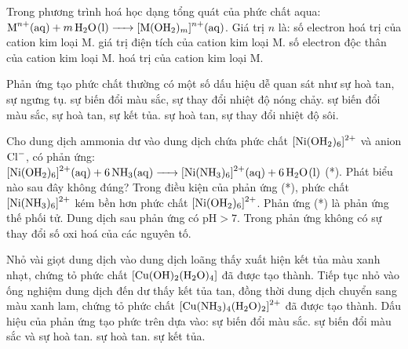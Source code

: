 \documentclass[11pt,a4paper]{article}
\begin{document}
\begin{ex}
Trong phương trình hoá học dạng tổng quát của phức chất aqua: $\ce{M^{n+}(aq) + m H2O(l) -> [M(OH2)_m]^{n+}(aq)}$. Giá trị $n$ là:
\choice
{số electron hoá trị của cation kim loại M.}
{\True giá trị điện tích của cation kim loại M.}
{số electron độc thân của cation kim loại M.}
{hoá trị của cation kim loại M.}
\end{ex}

\begin{ex}
Phản ứng tạo phức chất thường có một số dấu hiệu dễ quan sát như
\choice
{sự hoà tan, sự ngưng tụ.}
{sự biến đổi màu sắc, sự thay đổi nhiệt độ nóng chảy.}
{\True sự biến đổi màu sắc, sự hoà tan, sự kết tủa.}
{sự hoà tan, sự thay đổi nhiệt độ sôi.}
\end{ex}

\begin{ex}
Cho dung dịch ammonia dư vào dung dịch chứa phức chất $\ce{[Ni(OH2)6]^2+}$ và anion $\ce{Cl-}$, có phản ứng: $\ce{[Ni(OH2)6]^2+(aq) + 6NH3(aq) -> [Ni(NH3)6]^2+(aq) + 6H2O(l)}$ (*). Phát biểu nào sau đây không đúng?
\choice
{\True Trong điều kiện của phản ứng (*), phức chất $\ce{[Ni(NH3)6]^2+}$ kém bền hơn phức chất $\ce{[Ni(OH2)6]^2+}$.}
{Phản ứng (*) là phản ứng thế phối tử.}
{Dung dịch sau phản ứng có $\text{pH} > 7$.}
{Trong phản ứng không có sự thay đổi số oxi hoá của các nguyên tố.}
\end{ex}

\begin{ex}
Nhỏ vài giọt dung dịch  vào dung dịch  loãng thấy xuất hiện kết tủa màu xanh nhạt, chứng tỏ phức chất $\ce{[Cu(OH)2(H2O)4]}$ đã được tạo thành. Tiếp tục nhỏ vào ống nghiệm dung dịch  đến dư thấy kết tủa tan, đồng thời dung dịch chuyển sang màu xanh lam, chứng tỏ phức chất $\ce{[Cu(NH3)4(H2O)2]^2+}$ đã được tạo thành. Dấu hiệu của phản ứng tạo phức trên dựa vào:
\choice
{sự biến đổi màu sắc.}
{\True sự biến đổi màu sắc và sự hoà tan.}
{sự hoà tan.}
{sự kết tủa.}
\end{ex}
\end{document}
